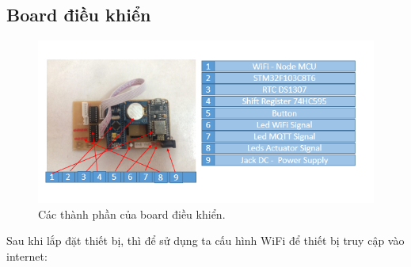 \documentclass[a4paper,12pt,oneside]{article}
\begin{document}
\subsection{Board điều khiển}
	\begin{figure}[H]
	\centering
	\includegraphics[scale=1]{hinh/board-guide.png}
	\caption{Các thành phần của board điều khiển.}
	\end{figure}
\noindent Sau khi lắp đặt thiết bị, thì để sử dụng ta cấu hình WiFi để thiết bị truy cập vào internet:
\end{document}
